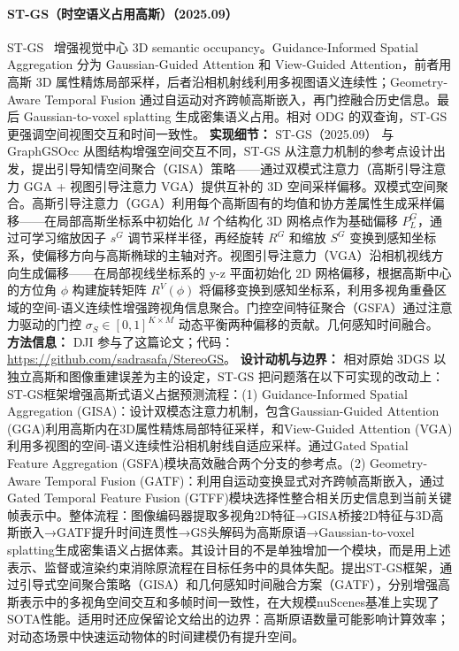\paragraph{ST-GS（时空语义占用高斯）（2025.09）}
ST-GS~\cite{2509_16552} 增强视觉中心 3D semantic occupancy。Guidance-Informed Spatial Aggregation 分为 Gaussian-Guided Attention 和 View-Guided Attention，前者用高斯 3D 属性精炼局部采样，后者沿相机射线利用多视图语义连续性；Geometry-Aware Temporal Fusion 通过自运动对齐跨帧高斯嵌入，再门控融合历史信息。最后 Gaussian-to-voxel splatting 生成密集语义占用。相对 ODG 的双查询，ST-GS 更强调空间视图交互和时间一致性。
\textbf{实现细节：} ST-GS（2025.09） 与 GraphGSOcc 从图结构增强空间交互不同，ST-GS 从注意力机制的参考点设计出发，提出引导知情空间聚合（GISA）策略——通过双模式注意力（高斯引导注意力 GGA + 视图引导注意力 VGA）提供互补的 3D 空间采样偏移。双模式空间聚合。高斯引导注意力（GGA）利用每个高斯固有的均值和协方差属性生成采样偏移——在局部高斯坐标系中初始化 $M$ 个结构化 3D 网格点作为基础偏移 $P_L^G$，通过可学习缩放因子 $s^G$ 调节采样半径，再经旋转 $R^G$ 和缩放 $S^G$ 变换到感知坐标系，使偏移方向与高斯椭球的主轴对齐。视图引导注意力（VGA）沿相机视线方向生成偏移——在局部视线坐标系的 y-z 平面初始化 2D 网格偏移，根据高斯中心的方位角 $\phi$ 构建旋转矩阵 $R^V(\phi)$ 将偏移变换到感知坐标系，利用多视角重叠区域的空间-语义连续性增强跨视角信息聚合。门控空间特征聚合（GSFA）通过注意力驱动的门控 $\sigma_S \in [0,1]^{K \times M}$ 动态平衡两种偏移的贡献。几何感知时间融合。
\textbf{方法信息：} DJI 参与了这篇论文；代码：\url{https://github.com/sadrasafa/StereoGS}。
\textbf{设计动机与边界：} 相对原始 3DGS 以独立高斯和图像重建误差为主的设定，ST-GS 把问题落在以下可实现的改动上：ST-GS框架增强高斯式语义占据预测流程：(1) Guidance-Informed Spatial Aggregation (GISA)：设计双模态注意力机制，包含Gaussian-Guided Attention (GGA)利用高斯内在3D属性精炼局部特征采样，和View-Guided Attention (VGA)利用多视图的空间-语义连续性沿相机射线自适应采样。通过Gated Spatial Feature Aggregation (GSFA)模块高效融合两个分支的参考点。(2) Geometry-Aware Temporal Fusion (GATF)：利用自运动变换显式对齐跨帧高斯嵌入，通过Gated Temporal Feature Fusion (GTFF)模块选择性整合相关历史信息到当前关键帧表示中。整体流程：图像编码器提取多视角2D特征→GISA桥接2D特征与3D高斯嵌入→GATF提升时间连贯性→GS头解码为高斯原语→Gaussian-to-voxel splatting生成密集语义占据体素。其设计目的不是单独增加一个模块，而是用上述表示、监督或渲染约束消除原流程在目标任务中的具体失配。提出ST-GS框架，通过引导式空间聚合策略（GISA）和几何感知时间融合方案（GATF），分别增强高斯表示中的多视角空间交互和多帧时间一致性，在大规模nuScenes基准上实现了SOTA性能。适用时还应保留论文给出的边界：高斯原语数量可能影响计算效率；对动态场景中快速运动物体的时间建模仍有提升空间。
